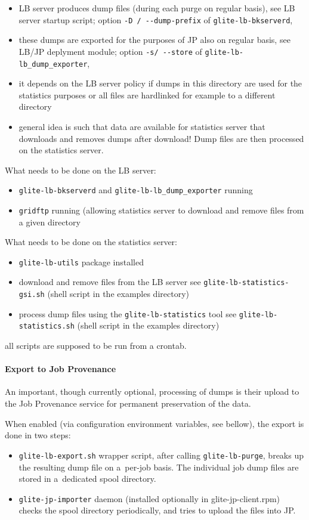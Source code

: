 \begin{itemize}
\item LB server produces dump files (during each purge on regular basis),
see LB server startup script; option \verb'-D / --dump-prefix' of \verb'glite-lb-bkserverd',
\item these dumps are exported for the purposes of JP also on regular basis,
see LB/JP deplyment module; option \verb'-s/ --store' of \verb'glite-lb-lb_dump_exporter',
\item it depends on the LB server policy if dumps in this directory are used for
the statistics purposes or all files are hardlinked for example to a different
directory
\item general idea is such that data are available for statistics server that downloads
and removes dumps after download! Dump files are then processed on the statistics
server.
\end{itemize}

What needs to be done on the LB server:
\begin{itemize}
\item \verb'glite-lb-bkserverd' and \verb'glite-lb-lb_dump_exporter' running
\item \verb'gridftp' running (allowing statistics server to download and remove files from 
a given directory
\end{itemize}


What needs to be done on the statistics server:
\begin{itemize}
\item \verb'glite-lb-utils' package installed
\item download and remove files from the LB server
see \verb'glite-lb-statistics-gsi.sh' (shell script in the examples directory)
\item process dump files using the \verb'glite-lb-statistics' tool
see \verb'glite-lb-statistics.sh' (shell script in the examples directory)
\end{itemize}
all scripts are supposed to be run from a crontab.


\paragraph{Export to Job Provenance}

An important, though currently optional, processing of \LB dumps
is their upload to the Job Provenance service for permanent preservation
of the data.


When enabled (via configuration environment variables, see bellow), 
the export is done in two steps:
\begin{itemize}
\item \verb'glite-lb-export.sh' wrapper script, after calling \verb'glite-lb-purge', breaks up the resulting dump file on a~per-job basis.
The individual job dump files are stored in a~dedicated spool directory.
\item \verb'glite-jp-importer' daemon (installed optionally in glite-jp-client.rpm) checks the spool directory periodically,
and tries to upload the files into JP.
\end{itemize}

